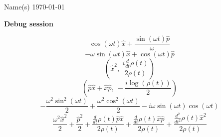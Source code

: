 \documentclass[12pt]{article}
\begin{document}
\noindent Name(s) \hfill \today \\[30pt]
\centerline{ \Large{ \textbf{ Debug session}}}
\begin{equation}
	\cos{\left(\omega t \right)} \hat{x} + \frac{\sin{\left(\omega t \right)} \hat{p}}{\omega}
\end{equation}
\begin{equation*}
	- \omega \sin{\left(\omega t \right)} \hat{x} + \cos{\left(\omega t \right)} \hat{p}
\end{equation*}
\begin{equation*}
	\left( \hat{x}^{2}, \  \frac{i \frac{d}{d t} \rho{\left(t \right)}}{2 \rho{\left(t \right)}}\right)
\end{equation*}
\begin{equation*}
	\left( \hat{p} \hat{x} + \hat{x} \hat{p}, \  - \frac{i \log{\left(\rho{\left(t \right)} \right)}}{2}\right)
\end{equation*}
\begin{equation*}
	- \frac{\omega^{2} \sin^{2}{\left(\omega t \right)}}{2} + \frac{\omega^{2} \cos^{2}{\left(\omega t \right)}}{2} - i \omega \sin{\left(\omega t \right)} \cos{\left(\omega t \right)}
\end{equation*}
\begin{equation*}
	\frac{\omega^{2} \hat{x}^{2}}{2} + \frac{\hat{p}^{2}}{2} + \frac{\frac{d}{d t} \rho{\left(t \right)} \hat{p} \hat{x}}{2 \rho{\left(t \right)}} + \frac{\frac{d}{d t} \rho{\left(t \right)} \hat{x} \hat{p}}{2 \rho{\left(t \right)}} + \frac{\frac{d^{2}}{d t^{2}} \rho{\left(t \right)} \hat{x}^{2}}{2 \rho{\left(t \right)}}
\end{equation*}
{} %

\end{document}

